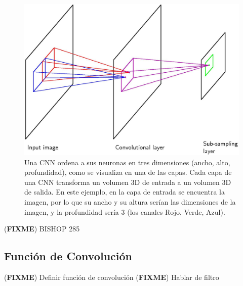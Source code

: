 \documentclass[a4paper,11pt,spanish]{book}
\newcommand*{\FIXME}[1]{{(\textbf{FIXME}) {#1}}}
\begin{document}
    \begin{figure}[h]
      \begin{center}
      \includegraphics[width=0.8\linewidth]{./img/bishop_cnn.jpg}
      \end{center}
      \caption{Una CNN ordena a sus neuronas en tres dimensiones (ancho, alto, profundidad), como se visualiza en una de
	las capas. Cada capa de una CNN transforma un volumen 3D de entrada a un volumen 3D de salida. En este ejemplo, en la capa de entrada se encuentra la imagen, por lo que su ancho y su altura
	serían las dimensiones de la imagen, y la profundidad sería 3 (los canales Rojo, Verde, Azul). \cite{Karpathy:Stanford}}
      \label{fig:bishop_cnn}
    \end{figure}
      
    \FIXME{BISHOP 285 }
    \subsection{Función de Convolución}
      \FIXME{Definir función de convolución}
      \FIXME{Hablar de filtro}
\end{document}
